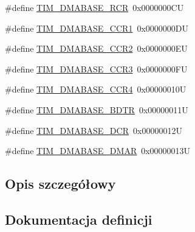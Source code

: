 \begin{DoxyCompactItemize}
\item 
\#define \hyperlink{group___t_i_m___d_m_a___base__address_gac26cff34f1d207798b946c01a40f5d89}{T\+I\+M\+\_\+\+D\+M\+A\+B\+A\+S\+E\+\_\+\+R\+CR}~0x0000000\+CU
\item 
\#define \hyperlink{group___t_i_m___d_m_a___base__address_ga2d1bc7e5ae83b91caa352276d15142dc}{T\+I\+M\+\_\+\+D\+M\+A\+B\+A\+S\+E\+\_\+\+C\+C\+R1}~0x0000000\+DU
\item 
\#define \hyperlink{group___t_i_m___d_m_a___base__address_ga0c73e7e1fa212ab14a43ca49e9d8850e}{T\+I\+M\+\_\+\+D\+M\+A\+B\+A\+S\+E\+\_\+\+C\+C\+R2}~0x0000000\+EU
\item 
\#define \hyperlink{group___t_i_m___d_m_a___base__address_gae3c259f405c78e31411c19195eac48bc}{T\+I\+M\+\_\+\+D\+M\+A\+B\+A\+S\+E\+\_\+\+C\+C\+R3}~0x0000000\+FU
\item 
\#define \hyperlink{group___t_i_m___d_m_a___base__address_gaea24fd3f528163da065cbdce3c68ef23}{T\+I\+M\+\_\+\+D\+M\+A\+B\+A\+S\+E\+\_\+\+C\+C\+R4}~0x00000010U
\item 
\#define \hyperlink{group___t_i_m___d_m_a___base__address_ga767eab033d485d32de80b46f70be3341}{T\+I\+M\+\_\+\+D\+M\+A\+B\+A\+S\+E\+\_\+\+B\+D\+TR}~0x00000011U
\item 
\#define \hyperlink{group___t_i_m___d_m_a___base__address_gab3e5aaf0cb815b4a2469d3046eca0201}{T\+I\+M\+\_\+\+D\+M\+A\+B\+A\+S\+E\+\_\+\+D\+CR}~0x00000012U
\item 
\#define \hyperlink{group___t_i_m___d_m_a___base__address_gafc79c60f0295d440ba3ed3bb3c73c739}{T\+I\+M\+\_\+\+D\+M\+A\+B\+A\+S\+E\+\_\+\+D\+M\+AR}~0x00000013U
\end{DoxyCompactItemize}


\subsection{Opis szczegółowy}


\subsection{Dokumentacja definicji}
\mbox{\label{group___t_i_m___d_m_a___base__address_ga3e08cd689d59f76dd5ca958a0ffdfb3d}} 
